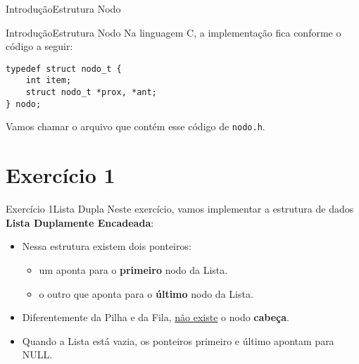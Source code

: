 \documentclass[aspectratio=169]{beamer}
\begin{document}
\begin{frame}[fragile]{Introdução}{Estrutura Nodo}
\begin{algorithm}[H]
\caption{Nodo} 
\label{Nodo}
\end{algorithm} 
\end{frame}


\begin{frame}[fragile]{Introdução}{Estrutura Nodo}
Na linguagem C, a implementação fica conforme o código a seguir:
\begin{lstlisting}[style=CStyle]
typedef struct nodo_t {
    int item;
    struct nodo_t *prox, *ant; 
} nodo;
\end{lstlisting}   
Vamos chamar o arquivo que contém esse código de \verb|nodo.h|.
\end{frame}


\section{Exercício 1}

\begin{frame}{Exercício 1}{Lista Dupla}
Neste exercício, vamos implementar a estrutura de dados {\bf Lista Duplamente Encadeada}:
\begin{itemize}
 \item Nessa estrutura existem dois ponteiros:
 \begin{itemize}
    \item um aponta para o {\bf primeiro} nodo da Lista.
    \item o outro que aponta para o {\bf último} nodo da Lista.
 \end{itemize}
 \item Diferentemente da Pilha e da Fila, \underline{não existe} o nodo {\bf cabeça}.
 \item Quando a Lista está vazia, os ponteiros primeiro e último apontam para NULL.
\end{itemize}
\end{frame}

\end{document}
